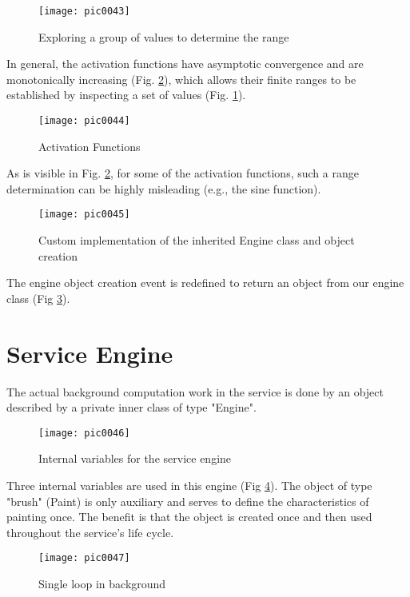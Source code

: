 \begin{figure}[h]
\centering
\texttt{[image: pic0043]}
\caption{Exploring a group of values to determine the range}
\label{fig:pic0043}
\end{figure}
\FloatBarrier

In general, the activation functions have asymptotic convergence and are monotonically increasing (Fig. \ref{fig:pic0044}), which allows their finite ranges to be established by inspecting a set of values (Fig. \ref{fig:pic0043}).

\begin{figure}[h]
\centering
\texttt{[image: pic0044]}
\caption{Activation Functions \cite{afwiki}}
\label{fig:pic0044}
\end{figure}
\FloatBarrier

As is visible in Fig. \ref{fig:pic0044}, for some of the activation functions, such a range determination can be highly misleading (e.g., the sine function).

\begin{figure}[h]
\centering
\texttt{[image: pic0045]}
\caption{Custom implementation of the inherited Engine class and object creation}
\label{fig:pic0045}
\end{figure}
\FloatBarrier

The engine object creation event is redefined to return an object from our engine class (Fig \ref{fig:pic0045}).

\section{Service Engine}

The actual background computation work in the service is done by an object described by a private inner class of type "Engine".

\begin{figure}[h]
\centering
\texttt{[image: pic0046]}
\caption{Internal variables for the service engine}
\label{fig:pic0046}
\end{figure}
\FloatBarrier

Three internal variables are used in this engine (Fig \ref{fig:pic0046}). The object of type "brush" (Paint) is only auxiliary and serves to define the characteristics of painting once. The benefit is that the object is created once and then used throughout the service's life cycle.

\begin{figure}[h]
\centering
\texttt{[image: pic0047]}
\caption{Single loop in background}
\label{fig:pic0047}
\end{figure}
\FloatBarrier

